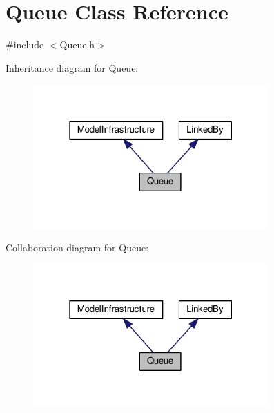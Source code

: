 \hypertarget{class_queue}{}\section{Queue Class Reference}
\label{class_queue}


{\ttfamily \#include $<$Queue.\+h$>$}



Inheritance diagram for Queue\+:
\nopagebreak
\begin{figure}[H]
\begin{center}
\leavevmode
\includegraphics[width=256pt]{class_queue__inherit__graph}
\end{center}
\end{figure}


Collaboration diagram for Queue\+:
\nopagebreak
\begin{figure}[H]
\begin{center}
\leavevmode
\includegraphics[width=256pt]{class_queue__coll__graph}
\end{center}
\end{figure}
